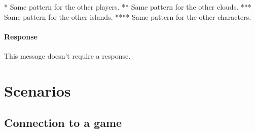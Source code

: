 \documentclass[a4paper]{article}
\begin{document}
	* Same pattern for the other players.\newline
	** Same pattern for the other clouds. \newline
	*** Same pattern for the other islands. \newline
	**** Same pattern for the other characters. \newline

	\paragraph{Response} This message doesn't require a response.

	\pagebreak

	\section{Scenarios}

	\subsection{Connection to a game}
\end{document}
